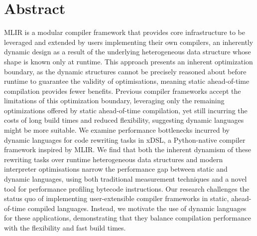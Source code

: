\chapter*{Abstract}


\makeatletter
{\large\textsl{\@title}}
\makeatother
\vspace{0.5em}

MLIR is a modular compiler framework that provides core infrastructure to be leveraged and extended by users implementing their own compilers, an inherently dynamic design as a result of the underlying heterogeneous data structure whose shape is known only at runtime. %
This approach presents an inherent optimization boundary, as the dynamic structures cannot be precisely reasoned about before runtime to guarantee the validity of optimisations, meaning static ahead-of-time compilation provides fewer benefits.
Previous compiler frameworks accept the limitations of this optimization boundary, leveraging only the remaining optimizations offered by static ahead-of-time compilation, yet still incurring the costs of long build times and reduced flexibility, suggesting dynamic languages might be more suitable.
We examine performance bottlenecks incurred by dynamic languages for code rewriting tasks in xDSL, a Python-native compiler framework inspired by MLIR.
We find that both the inherent dynamism of these rewriting tasks over runtime heterogeneous data structures and modern interpreter optimisations narrow the performance gap between static and dynamic languages, using both traditional measurement techniques and a novel tool for performance profiling bytecode instructions.
Our research challenges the status quo of implementing user-extensible compiler frameworks in static, ahead-of-time compiled languages.
Instead, we motivate the use of dynamic languages for these applications, demonstrating that they balance compilation performance with the flexibility and fast build times.

